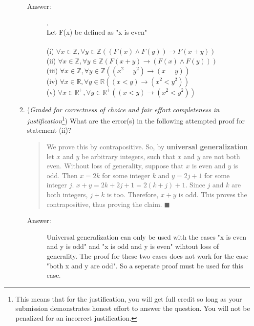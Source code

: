\documentclass[12pt, oneside]{article}
\begin{document}
\begin{enumerate}
\begin{enumerate}
\begin{description}
    \item[Answer:] .\\
    Let F(x) be defined as "x is even" \\\\
    (i) $\forall x \in \mathbb{Z}, \forall y \in \mathbb{Z} ((F(x) \land F(y)) \rightarrow F(x+y))$ \\
    (ii) $\forall x \in \mathbb{Z}, \forall y \in \mathbb{Z} (F(x+y) \rightarrow (F(x) \land F(y)))$ \\
    (iii) $\forall x \in \mathbb{Z}, \forall y \in \mathbb{Z} ((x^2=y^2) \rightarrow (x=y))$ \\
    (iv) $\forall x \in \mathbb{R}, \forall y \in \mathbb{R} ((x<y) \rightarrow (x^2 < y^2))$ \\
    (v) $\forall x \in \mathbb{R^+}, \forall y \in \mathbb{R^+} ((x<y) \rightarrow (x^2<y^2))$
\end{description}

\item ({\it Graded for correctness of choice and fair effort completeness in justification}\footnote{This means that for the justification, you will get full credit so long as your submission 
demonstrates honest effort to answer the question. You will not be penalized for an incorrect justification.}) What are the error(s) in the following attempted proof for statement (ii)?

\begin{quote}
  We prove this by contrapositive. So, by \textbf{universal generalization} let $x$ and $y$ be arbitrary integers, such that $x$ and $y$ are not both even. Without loss of generality, suppose that $x$ is even and $y$ is odd. Then $x=2k$ for some integer $k$ and $y=2j+1$ for some integer $j$. $x+y=2k+2j+1=2(k+j)+1$. Since $j$ and $k$ are both integers, $j+k$ is too. Therefore, $x+y$ is odd. This proves the contrapositive, thus proving the claim. \hfill{$\blacksquare$}
\end{quote}

\begin{description}
    \item[Answer:] Universal generalization can only be used with the cases "x is even and y is odd" and "x is odd and y is even" wihtout loss of generality. The proof for these two cases does not work for the case "both x and y are odd". So a seperate proof must be used for this case.
\end{description}


\end{enumerate}
\end{enumerate}
\end{document}
